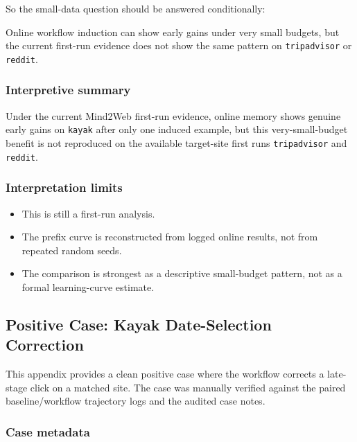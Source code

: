 So the small-data question should be answered conditionally:

Online workflow induction can show early gains under very small budgets,
but the current first-run evidence does not show the same pattern on
\texttt{tripadvisor} or \texttt{reddit}.

\subsubsection{Interpretive summary}

Under the current Mind2Web first-run evidence, online memory shows
genuine early gains on \texttt{kayak} after only one induced example,
but this very-small-budget benefit is not reproduced on the available
target-site first runs \texttt{tripadvisor} and \texttt{reddit}.

\subsubsection{Interpretation limits}

\begin{itemize}
\tightlist
\item
  This is still a first-run analysis.
\item
  The prefix curve is reconstructed from logged online results, not from
  repeated random seeds.
\item
  The comparison is strongest as a descriptive small-budget pattern, not
  as a formal learning-curve estimate.
\end{itemize}


\clearpage
\subsection{Positive Case: Kayak Date-Selection Correction}\label{app:B1}

This appendix provides a clean positive case where the workflow
corrects a late-stage click on a matched site. The case was manually
verified against the paired baseline/workflow trajectory logs and the
audited case notes.

\subsubsection{Case metadata}

